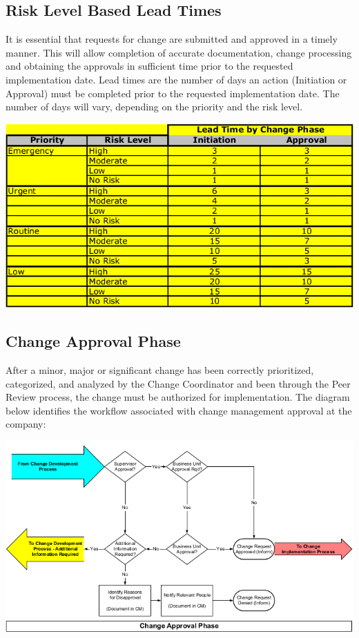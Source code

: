 \documentclass[8pt]{extarticle}
\begin{document}
\begin{multicols}{3}
\subsection{Risk Level Based Lead Times}
It is essential that requests for change are submitted and approved in a timely manner. This will allow
completion of accurate documentation, change processing and obtaining the approvals in sufficient time
prior to the requested implementation date.
Lead times are the number of days an action (Initiation or Approval) must be completed prior to the
requested implementation date. The number of days will vary, depending on the priority and the risk
level.
\begin{center}
    \begin{minipage}{\columnwidth}
        \includegraphics[width=\columnwidth]{risk-based-lead-times.png}
    \end{minipage}
\end{center}

\subsection{Change Approval Phase}
After a minor, major or significant change has been correctly prioritized, categorized, and analyzed by the
Change Coordinator and been through the Peer Review process, the change must be authorized for
implementation. The diagram below identifies the workflow associated with change management
approval at the company:
\begin{center}
    \begin{minipage}{\columnwidth}
        \includegraphics[width=\columnwidth]{change-approval-phase.png}
    \end{minipage}
\end{center}


\end{multicols}
\end{document}
